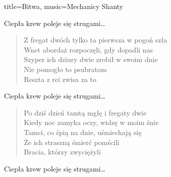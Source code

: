 \begin{song}{title={Bitwa}, music={Mechanicy Shanty}}
\begin{multicols}{2}
    \begin{chorus}
        Ciepła krew poleje się strugami\ldots
    \end{chorus}
    \begin{verse}
        Z fregat dwóch tylko ta pierwsza w pogoń szła \\
        Wnet abordaż rozpoczęli, gdy dopadli nas \\
        Szyper ich dziury dwie zrobił w swoim dnie \\
        Nie pomogło to psubratom \\
        Reszta z rei zwisa za to
    \end{verse}
    \begin{chorus}
        Ciepła krew poleje się strugami\ldots
    \end{chorus}
    \begin{verse}
        Po dziś dzień tamtą mgłę i fregaty dwie \\
        Kiedy noc zamyka oczy, widzę w moim śnie \\
        Tamci, co śpią na dnie, uśmiechają się \\
        Że ich straszną śmierć pomścili \\
        Bracia, którzy zwyciężyli
    \end{verse}
    \begin{chorus}
        Ciepła krew poleje się strugami\ldots
    \end{chorus}
    \end{multicols}
\end{song}

